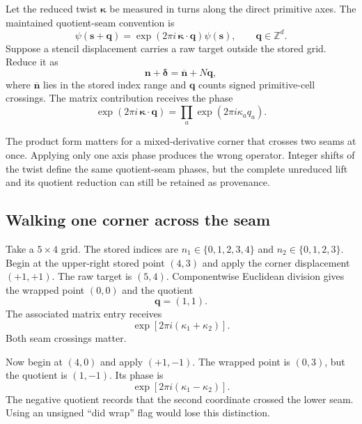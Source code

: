 Let the reduced twist $\boldsymbol\kappa$ be measured in turns along the direct
primitive axes. The maintained quotient-seam convention is
\begin{equation}
  \psi(\mathbf s+\mathbf q)
  =
  \exp\!\left(2\pi i\,\boldsymbol\kappa\cdot\mathbf q\right)
  \psi(\mathbf s),
  \qquad
  \mathbf q\in\mathbb Z^d.
  \label{eq:training-bloch-seam}
\end{equation}
Suppose a stencil displacement carries a raw target outside the stored grid.
Reduce it as
\begin{equation}
  \mathbf n+\boldsymbol\delta
  =\overline{\mathbf n}+N\mathbf q,
  \label{eq:training-grid-quotient}
\end{equation}
where $\overline{\mathbf n}$ lies in the stored index range and $\mathbf q$
counts signed primitive-cell crossings. The matrix contribution receives the
phase
\begin{equation}
  \exp\!\left(2\pi i\,\boldsymbol\kappa\cdot\mathbf q\right)
  =
  \prod_a\exp\!\left(2\pi i\kappa_a q_a\right).
  \label{eq:training-seam-product}
\end{equation}

The product form matters for a mixed-derivative corner that crosses two seams
at once. Applying only one axis phase produces the wrong operator. Integer
shifts of the twist define the same quotient-seam phases, but the complete
unreduced lift and its quotient reduction can still be retained as provenance.

\subsection{Walking one corner across the seam}

Take a $5\times4$ grid. The stored indices are
$n_1\in\{0,1,2,3,4\}$ and $n_2\in\{0,1,2,3\}$. Begin at the upper-right stored
point $(4,3)$ and apply the corner displacement $(+1,+1)$. The raw target is
$(5,4)$. Componentwise Euclidean division gives the wrapped point $(0,0)$ and
the quotient
\begin{equation}
  \mathbf q=(1,1).
\end{equation}
The associated matrix entry receives
\begin{equation}
  \exp\!\left[2\pi i(\kappa_1+\kappa_2)\right].
  \label{eq:training-double-wrap-phase}
\end{equation}
Both seam crossings matter.

Now begin at $(4,0)$ and apply $(+1,-1)$. The wrapped point is $(0,3)$, but the
quotient is $(1,-1)$. Its phase is
\begin{equation}
  \exp\!\left[2\pi i(\kappa_1-\kappa_2)\right].
\end{equation}
The negative quotient records that the second coordinate crossed the lower
seam. Using an unsigned ``did wrap'' flag would lose this distinction.

